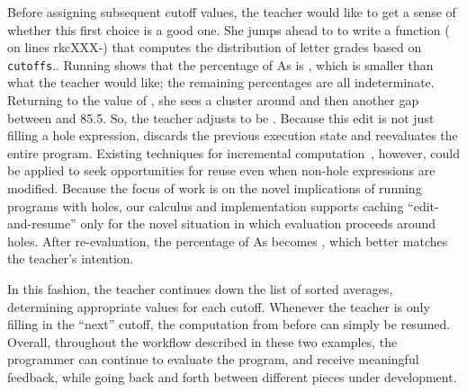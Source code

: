 Before assigning subsequent cutoff values, the teacher would like to get a sense
of whether this first choice is a good one.
%
She jumps ahead to to write a function ( on lines
rkc{XXX}-) that computes the distribution of letter grades based
on \verb+cutoffs+..
%
Running  shows that the percentage of As is
, which is smaller than what the teacher would like;
the remaining percentages are all indeterminate.
%
Returning to the value of , she sees a cluster around 
and then another gap between  and {85.5}.
%
So, the teacher adjusts  to be .
%
Because this edit is not just filling a hole expression, \Hazel{} discards the
previous execution state and reevaluates the entire program.
%
Existing techniques for incremental computation~\cite{XXX,XXX}, however, could
be applied to seek opportunities for reuse even when non-hole expressions are
modified.
%
Because the focus of work is on the novel implications of running programs with
holes, our calculus and implementation supports caching ``edit-and-resume'' only
for the novel situation in which evaluation proceeds around holes.
%
After re-evaluation, the percentage of As becomes , which better
matches the teacher's intention.

In this fashion, the teacher continues down the list of sorted averages,
determining appropriate values for each cutoff.
%
Whenever the teacher is only filling in the ``next'' cutoff, the computation
from before can simply be resumed.
%
Overall, throughout the workflow described in these two examples, the programmer
can continue to evaluate the program, and receive meaningful feedback, while
going back and forth between different pieces under development.
